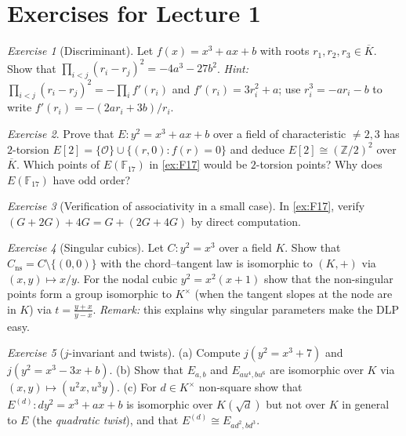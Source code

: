 \documentclass[11pt,a4paper,oneside]{book}
\theoremstyle{plain}
\theoremstyle{definition}
\theoremstyle{remark}
\newtheorem{exercise}{Exercise}[chapter]
\newcommand{\Z}{\mathbb{Z}}
\newcommand{\F}{\mathbb{F}}
\newcommand{\Oinf}{\mathcal{O}}
\newcommand{\Kbar}{\overline{K}}
\begin{document}
\section*{Exercises for Lecture 1}

\begin{exercise}[Discriminant]\label{ex:L1-disc}
Let $f(x)=x^3+ax+b$ with roots $r_1,r_2,r_3\in\Kbar$. Show that $\prod_{i<j}(r_i-r_j)^2=-4a^3-27b^2$.
\emph{Hint:} $\prod_{i<j}(r_i-r_j)^2=-\prod_if'(r_i)$ and $f'(r_i)=3r_i^2+a$; use $r_i^3=-ar_i-b$ to write $f'(r_i)=-(2ar_i+3b)/r_i$.
\end{exercise}

\begin{exercise}
Prove that $E:y^2=x^3+ax+b$ over a field of characteristic $\ne2,3$ has $2$-torsion $E[2]=\{\Oinf\}\cup\{(r,0): f(r)=0\}$ and deduce $E[2]\cong(\Z/2)^2$ over $\Kbar$. Which points of $E(\F_{17})$ in \cref{ex:F17} would be $2$-torsion points? Why does $E(\F_{17})$ have odd order?
\end{exercise}

\begin{exercise}[Verification of associativity in a small case]
In \cref{ex:F17}, verify $(G+2G)+4G=G+(2G+4G)$ by direct computation.
\end{exercise}

\begin{exercise}[Singular cubics]
Let $C:y^2=x^3$ over a field $K$. Show that $C_{\mathrm{ns}}=C\setminus\{(0,0)\}$ with the chord--tangent law is isomorphic to $(K,+)$ via $(x,y)\mapsto x/y$. For the nodal cubic $y^2=x^2(x+1)$ show that the non-singular points form a group isomorphic to $K^\times$ (when the tangent slopes at the node are in $K$) via $t=\frac{y+x}{y-x}$.
\emph{Remark:} this explains why singular parameters make the DLP easy.
\end{exercise}

\begin{exercise}[$j$-invariant and twists]
(a) Compute $j(y^2=x^3+7)$ and $j(y^2=x^3-3x+b)$. (b) Show that $E_{a,b}$ and $E_{au^4,bu^6}$ are isomorphic over $K$ via $(x,y)\mapsto(u^2x,u^3y)$. (c) For $d\in K^\times$ non-square show that $E^{(d)}:dy^2=x^3+ax+b$ is isomorphic over $K(\sqrt d)$ but not over $K$ in general to $E$ (the \emph{quadratic twist}), and that $E^{(d)}\cong E_{ad^2,bd^3}$.
\end{exercise}
\end{document}
